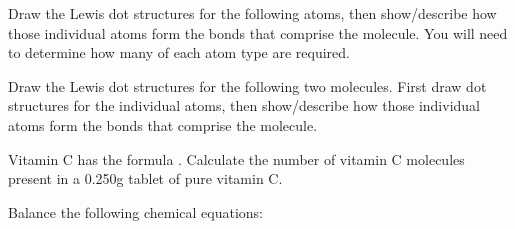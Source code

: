 \documentclass[addpoints, 12pt]{exam}
\begin{document}
\begin{questions}

\question[10] Draw the Lewis dot structures for the following atoms, then
show/describe how those individual atoms form the bonds that comprise
the molecule.  You will need to determine how many of each atom type
are required.


\question[10] Draw the Lewis dot structures for the following two
molecules.  First draw dot structures for the individual atoms, then
show/describe how those individual atoms form the bonds that comprise
the molecule.


\question[10] Vitamin C has the formula . Calculate the number
of vitamin C molecules present in a 0.250g tablet of pure vitamin C.
\vspace{3cm}

\question[20] Balance the following chemical equations: 
\end{questions}
\end{document}
